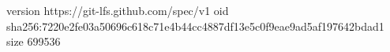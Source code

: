 version https://git-lfs.github.com/spec/v1
oid sha256:7220e2fe03a50696c618c71e4b44cc4887df13e5c0f9eae9ad5af197642bdad1
size 699536
